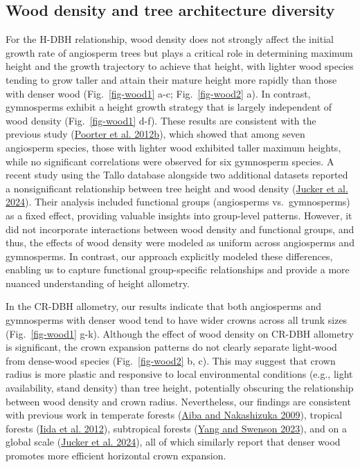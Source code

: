 \documentclass[
  12pt,
  letterpaper,
  DIV=11,
  numbers=noendperiod]{scrartcl}
\begin{document}
\hypertarget{wood-density-and-tree-architecture-diversity}{%
\subsection{Wood density and tree architecture
diversity}\label{wood-density-and-tree-architecture-diversity}}

For the H-DBH relationship, wood density does not strongly affect the
initial growth rate of angiosperm trees but plays a critical role in
determining maximum height and the growth trajectory to achieve that
height, with lighter wood species tending to grow taller and attain
their mature height more rapidly than those with denser wood
(Fig.~\ref{fig-wood1} a-c; Fig.~\ref{fig-wood2} a). In contrast,
gymnosperms exhibit a height growth strategy that is largely independent
of wood density (Fig.~\ref{fig-wood1} d-f). These results are consistent
with the previous study (\protect\hyperlink{ref-Poorter2012b}{Poorter et
al. 2012b}), which showed that among seven angiosperm species, those
with lighter wood exhibited taller maximum heights, while no significant
correlations were observed for six gymnosperm species. A recent study
using the Tallo database alongside two additional datasets reported a
nonsignificant relationship between tree height and wood density
(\protect\hyperlink{ref-Jucker2024}{Jucker et al. 2024}). Their analysis
included functional groups (angiosperms vs.~gymnosperms) as a fixed
effect, providing valuable insights into group-level patterns. However,
it did not incorporate interactions between wood density and functional
groups, and thus, the effects of wood density were modeled as uniform
across angiosperms and gymnosperms. In contrast, our approach explicitly
modeled these differences, enabling us to capture functional
group-specific relationships and provide a more nuanced understanding of
height allometry.

In the CR-DBH allometry, our results indicate that both angiosperms and
gymnosperms with denser wood tend to have wider crowns across all trunk
sizes (Fig.~\ref{fig-wood1} g-k). Although the effect of wood density on
CR-DBH allometry is significant, the crown expansion patterns do not
clearly separate light-wood from dense-wood species
(Fig.~\ref{fig-wood2} b, c). This may suggest that crown radius is more
plastic and responsive to local environmental conditions (e.g., light
availability, stand density) than tree height, potentially obscuring the
relationship between wood density and crown radius. Nevertheless, our
findings are consistent with previous work in temperate forests
(\protect\hyperlink{ref-Aiba2009}{Aiba and Nakashizuka 2009}), tropical
forests (\protect\hyperlink{ref-Iida2012}{Iida et al. 2012}),
subtropical forests (\protect\hyperlink{ref-Yang2023}{Yang and Swenson
2023}), and on a global scale (\protect\hyperlink{ref-Jucker2024}{Jucker
et al. 2024}), all of which similarly report that denser wood promotes
more efficient horizontal crown expansion.
\end{document}
